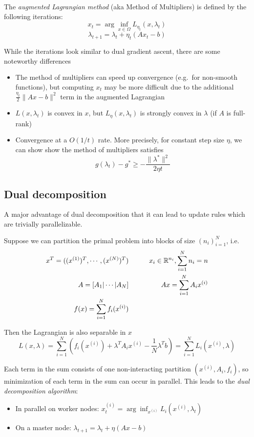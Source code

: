The \emph{augmented Lagrangian method} (aka Method of Multipliers) is
defined by the following iterations:
\[
x_t = \arg\inf_{x \in \Omega} L_{\eta_t} (x, \lambda_t)
\]
\[
\lambda_{t+1} = \lambda_t + \eta_t (A x_t - b)
\]

While the iterations look similar to dual gradient ascent, there are
some noteworthy differences
\begin{itemize}
\item The method of multipliers can speed up
convergence (e.g.~for non-smooth functions), but computing $x_t$ may
be more difficult due to the additional
$\frac{\eta_t}{2} \|A x - b\|^2$ term in the augmented Lagrangian
\item $L(x, \lambda_t)$ is convex in $x$, but $L_\eta(x, \lambda_t)$ is
strongly convex in $\lambda$ (if $A$ is full-rank)
\item Convergence at
a $O(1/t)$ rate. More precisely, for constant step size $\eta$, we
can show show the method of multipliers satisfies
\[g(\lambda_t) - g^* \geq -\frac{\|\lambda^*\|^2}{2\eta t}\]
\end{itemize}

\subsection{Dual decomposition}

A major advantage of dual decomposition that it can lead to update rules
which are trivially parallelizable.

Suppose we can partition the primal problem into blocks of size
$(n_i)_{i=1}^N$, i.e.
\begin{align*}
x ^T = ((x^{(1)})^T, \cdots, (x^{(N)})^T) &\qquad& x_i \in \mathbb{R}^{n_i}, \sum_{i=1}^N n_i = n \\
A = [A_1 \vert \cdots \vert A_N] &\qquad& A x = \sum_{i=1}^N A_i x^{(i)} \\
f(x) = \sum_{i=1}^N f_i(x^{(i)})
\end{align*}

Then the Lagrangian is also separable in $x$
\[
L(x, \lambda) = \sum_{i=1}^N \left( f_i(x^{(i)}) + \lambda^T A_i x^{(i)} - \frac{1}{N} \lambda^T b\right) = \sum_{i=1}^N L_i(x^{(i)}, \lambda)
\]

Each term in the sum consists of one non-interacting partition
$(x^{(i)}, A_i, f_i)$, so minimization of each term in the sum can
occur in parallel. This leads to the \emph{dual decomposition
algorithm}:

\begin{itemize}
\item
  In parallel on worker nodes:
  $x_t^{(i)} = \arg\inf_{x^{(i)}} L_i(x^{(i)}, \lambda_t)$
\item
  On a master node: $\lambda_{t+1} = \lambda_t + \eta (A x - b)$
\end{itemize}

